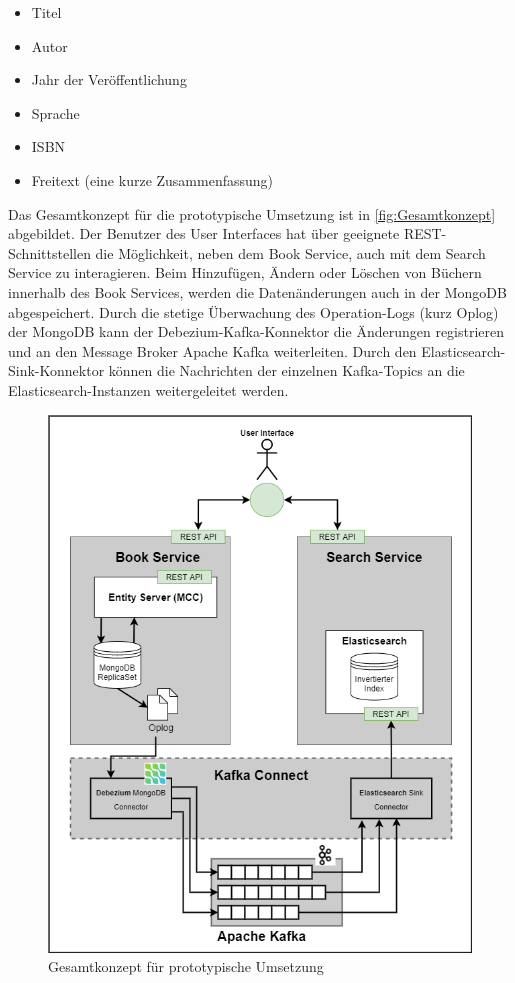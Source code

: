 \begin{itemize}
    \item Titel
    \item Autor
    \item Jahr der Veröffentlichung
    \item Sprache
    \item ISBN
    \item Freitext (eine kurze Zusammenfassung)
\end{itemize}

Das Gesamtkonzept für die prototypische Umsetzung ist in \autoref{fig:Gesamtkonzept} abgebildet.
Der Benutzer des User Interfaces hat über geeignete REST-Schnittstellen die Möglichkeit, neben dem Book Service, auch mit dem Search Service zu interagieren. Beim Hinzufügen, Ändern oder Löschen von Büchern innerhalb des Book Services, werden die Datenänderungen auch in der MongoDB abgespeichert. Durch die stetige Überwachung des Operation-Logs (kurz Oplog) der MongoDB kann der Debezium-Kafka-Konnektor die Änderungen registrieren und an den Message Broker \glqq Apache Kafka\grqq{} weiterleiten. Durch den Elasticsearch-Sink-Konnektor können die Nachrichten der einzelnen Kafka-Topics an die Elasticsearch-Instanzen weitergeleitet werden.

\begin{figure}[H]
    \centering
    \includegraphics[width=0.9\linewidth]{images/Gesamtkonzept.png}
    \caption{Gesamtkonzept für prototypische Umsetzung}
    \label{fig:Gesamtkonzept}
\end{figure}